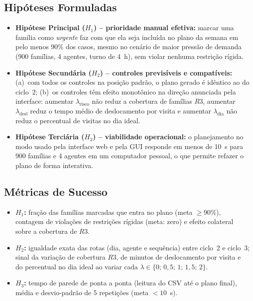 \documentclass[11pt,a4paper]{article}
\begin{document}
\subsection{Hipóteses Formuladas}
\begin{itemize}
    \item \textbf{Hipótese Principal ($H_1$) -- prioridade manual efetiva:} marcar uma família como \emph{urgente} faz com que ela seja incluída no plano da semana em pelo menos 90\% dos casos, mesmo no cenário de maior pressão de demanda (900 famílias, 4 agentes, turno de 4~h), sem violar nenhuma restrição rígida.
    \item \textbf{Hipótese Secundária ($H_2$) -- controles previsíveis e compatíveis:} (a)~com todos os controles na posição padrão, o plano gerado é idêntico ao do ciclo~2; (b)~os controles têm efeito monotônico na direção anunciada pela interface: aumentar $\lambda_{\text{risco}}$ não reduz a cobertura de famílias $R3$, aumentar $\lambda_{\text{desl}}$ reduz o tempo médio de deslocamento por visita e aumentar $\lambda_{\text{dia}}$ não reduz o percentual de visitas no dia ideal.
    \item \textbf{Hipótese Terciária ($H_3$) -- viabilidade operacional:} o planejamento no modo usado pela interface web e pela GUI responde em menos de 10~s para 900 famílias e 4 agentes em um computador pessoal, o que permite refazer o plano de forma interativa.
\end{itemize}

\subsection{Métricas de Sucesso}
\begin{itemize}
    \item \textbf{$H_1$:} fração das famílias marcadas que entra no plano (meta $\geq 90\%$), contagem de violações de restrições rígidas (meta: zero) e efeito colateral sobre a cobertura de $R3$.
    \item \textbf{$H_2$:} igualdade exata das rotas (dia, agente e sequência) entre ciclo~2 e ciclo~3; sinal da variação de cobertura $R3$, de minutos de deslocamento por visita e do percentual no dia ideal ao variar cada $\lambda \in \{0;\,0{,}5;\,1;\,1{,}5;\,2\}$.
    \item \textbf{$H_3$:} tempo de parede de ponta a ponta (leitura do CSV até o plano final), média e desvio-padrão de 5 repetições (meta $< 10$~s).
\end{itemize}
\end{document}
